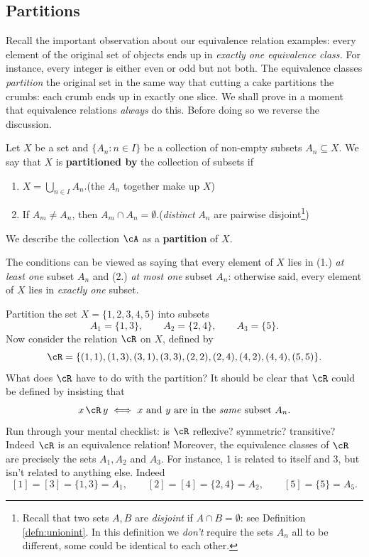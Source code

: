 \subsection{Partitions}

Recall the important observation about our equivalence relation examples: every element of the original set of objects ends up in \emph{exactly one equivalence class.} For instance, every integer is either even or odd but not both. The equivalence classes \emph{partition} the original set in the same way that cutting a cake partitions the crumbs: each crumb ends up in exactly one slice. We shall prove in a moment that equivalence relations \emph{always} do this. Before doing so we reverse the discussion.

\begin{defn}\label{defn:partition}
Let $X$ be a set and $\{A_n:n\in I\}$ be a collection of non-empty subsets $A_n\subseteq X$. We say that $X$ is \textbf{partitioned by} the collection of subsets if
\begin{enumerate}
\item $X=\bigcup\limits_{n\in I}A_n$.\hfill(the $A_n$ together make up $X$)\\[-10pt]
\item If $A_m\neq A_n$, then $A_m\cap A_n=\emptyset$.\hfill(\emph{distinct} $A_n$ are pairwise disjoint\footnote{Recall that two sets $A,B$ are \emph{disjoint} if $A\cap B=\emptyset$: see Definition \ref{defn:unionint}. In this definition we \emph{don't} require the sets $A_n$ all to be different, some could be identical to each other.})
\end{enumerate}
We describe the collection $\cA$ as a \textbf{partition} of $X$.
\end{defn}

\noindent The conditions can be viewed as saying that every element of $X$ lies in (1.) \emph{at least one} subset $A_n$ and (2.) \emph{at most one} subset $A_n$: otherwise said, every element of $X$ lies in \emph{exactly one} subset.

\begin{example}
Partition the set $X=\{1,2,3,4,5\}$ into subsets
\[A_1=\{1,3\},\qquad A_2=\{2,4\},\qquad A_3=\{5\}.\]
Now consider the relation $\cR$ on $X$, defined by
\[\cR=\{(1,1),(1,3),(3,1),(3,3),(2,2),(2,4),(4,2),(4,4),(5,5)\}.\]
What does $\cR$ have to do with the partition? It should be clear that $\cR$ could be defined by insisting that
\[x\,\cR\,y\iff \text{$x$ and $y$ are in the \emph{same} subset $A_n$.}\]
Run through your mental checklist: is $\cR$ reflexive? symmetric? transitive? Indeed $\cR$ is an equivalence relation! Moreover, the equivalence classes of $\cR$ are precisely the sets $A_1,A_2$ and $A_3$. For instance, 1 is related to itself and 3, but isn't related to anything else. Indeed
\[[1]=[3]=\{1,3\}=A_1,\qquad [2]=[4]=\{2,4\}=A_2,\qquad [5]=\{5\}=A_5.\]
\end{example} 

